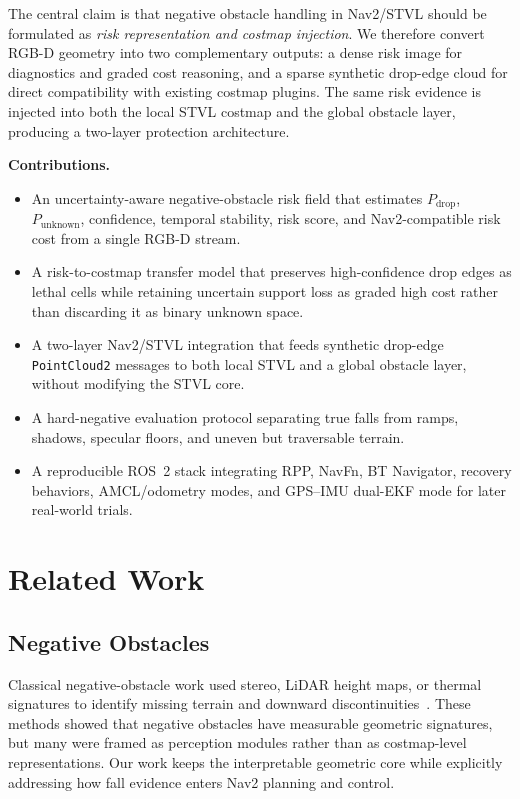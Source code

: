 \documentclass[journal]{IEEEtran}
\begin{document}
The central claim is that negative obstacle handling in Nav2/STVL should be formulated as
\emph{risk representation and costmap injection}. We therefore convert RGB-D geometry into
two complementary outputs: a dense risk image for diagnostics and graded cost reasoning,
and a sparse synthetic drop-edge cloud for direct compatibility with existing costmap
plugins. The same risk evidence is injected into both the local STVL costmap and the
global obstacle layer, producing a two-layer protection architecture.

\textbf{Contributions.}
\begin{itemize}
\item An uncertainty-aware negative-obstacle risk field that estimates
$P_\mathrm{drop}$, $P_\mathrm{unknown}$, confidence, temporal stability, risk score, and
Nav2-compatible risk cost from a single RGB-D stream.
\item A risk-to-costmap transfer model that preserves high-confidence drop edges as
lethal cells while retaining uncertain support loss as graded high cost rather than
discarding it as binary unknown space.
\item A two-layer Nav2/STVL integration that feeds synthetic drop-edge \texttt{PointCloud2}
messages to both local STVL and a global obstacle layer, without modifying the STVL core.
\item A hard-negative evaluation protocol separating true falls from ramps, shadows,
specular floors, and uneven but traversable terrain.
\item A reproducible ROS~2 stack integrating RPP, NavFn, BT Navigator, recovery behaviors,
AMCL/odometry modes, and GPS--IMU dual-EKF mode for later real-world trials.
\end{itemize}

\section{Related Work}
\label{sec:related}

\subsection{Negative Obstacles}
Classical negative-obstacle work used stereo, LiDAR height maps, or thermal signatures to
identify missing terrain and downward discontinuities~\cite{rankin2010negative,
larson2011lidar,matthies2007thermal,shang2014negative,morton2017terrain}. These methods
showed that negative obstacles have measurable geometric signatures, but many were framed
as perception modules rather than as costmap-level representations. Our work keeps the
interpretable geometric core while explicitly addressing how fall evidence enters Nav2
planning and control.
\end{document}
